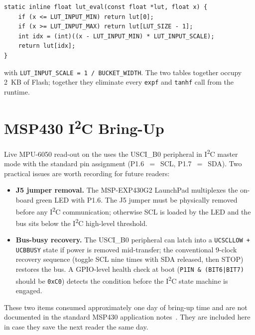 \begin{verbatim}
static inline float lut_eval(const float *lut, float x) {
    if (x <= LUT_INPUT_MIN) return lut[0];
    if (x >= LUT_INPUT_MAX) return lut[LUT_SIZE - 1];
    int idx = (int)((x - LUT_INPUT_MIN) * LUT_INPUT_SCALE);
    return lut[idx];
}
\end{verbatim}

with \texttt{LUT\_INPUT\_SCALE = 1 / BUCKET\_WIDTH}. The two tables
together occupy 2~KB of Flash; together they eliminate every
\texttt{expf} and \texttt{tanhf} call from the runtime.

\section{MSP430 I\textsuperscript{2}C Bring-Up}
\label{app:hw}

Live MPU-6050 read-out on the \msp{} uses the USCI\_B0 peripheral
in I\textsuperscript{2}C master mode with the standard pin
assignment (P1.6~$=$~SCL, P1.7~$=$~SDA). Two practical issues are
worth recording for future readers:

\begin{itemize}
\item \textbf{J5 jumper removal.} The MSP-EXP430G2 LaunchPad
multiplexes the on-board green LED with P1.6. The J5 jumper must
be physically removed before any I\textsuperscript{2}C
communication; otherwise SCL is loaded by the LED and the bus
sits below the I\textsuperscript{2}C high-level threshold.

\item \textbf{Bus-busy recovery.} The USCI\_B0 peripheral can latch
into a \texttt{UCSCLLOW + UCBBUSY} state if power is removed
mid-transfer; the conventional 9-clock recovery sequence
(toggle SCL nine times with SDA released, then STOP) restores the
bus. A GPIO-level health check at boot
(\texttt{P1IN \& (BIT6|BIT7)} should be \texttt{0xC0}) detects the
condition before the I\textsuperscript{2}C state machine is engaged.
\end{itemize}

These two items consumed approximately one day of bring-up time
and are not documented in the standard MSP430 application
notes~\cite{ti_msp430}. They are included here in case they save
the next reader the same day.
